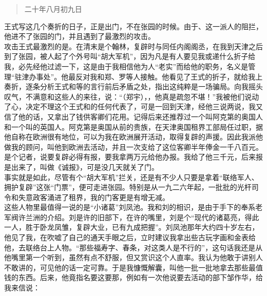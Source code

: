 \begin{quote}
\begin{flushright}
	二十年八月初九日\\
\end{flushright}
\end{quote}

王式写这几个奏折的日子，正是出门，不在张园的时候。由于、这一派人的阻拦，他进不了张园的门，并且遇到了最激烈的攻击。\\

攻击王式最激烈的是。在清末是个翰林，复辟时与同任内阁阁丞，在我到天津之后到了张园，被人起了个外号叫“胡大军机”，因为凡是有人要见我或递什么折子给我，必先经他过滤一下，这是由于我相信他为人“老实”而给他的职务，名义是管理“驻津办事处”。他最反对我和郑、罗等人接触。他看见了王式的折子，就给我上奏折，逐条分析王式和等的言行前后矛盾之处，指出这纯粹是一场骗局。向我摇头叹气，不满意和这些人的来往，说：“（郑宇），，他真是疏忽不堪！”我被他们说动了心，决定不理这个王式和的任何代表了，可是一回到天津，经他三说两说，我又信了他的话，又拿出了钱供客卿们花用。记得后来还推荐过一个叫阿克第的奥国人和一个叫的英国人。阿克第是奥国从前的贵族，在天津奥国租界工部局任过职，据他自称在欧洲很有地位，可以为我在欧洲展开活动，取得复辟的声援。因此我派他做我的顾问，叫他到欧洲去活动，并且一次支给了这位客卿半年俸金一千八百元。是个记者，说要复辟必得有报，要我拿两万元给他办报。我给了他三千元，后来报是出来了，叫做《诚报》，可是没几天就关了门。\\

事实就是如此，尽管有个“胡大军机”拦关，还是有不少人只要是拿着“联络军人、拥护复辟”这张“门票”，便可走进张园。特别是从一九二六年起，一批批的光杆司令和失意政客涌进了租界，我的门客更是有增无减。\\

这些人物里最值得一说的是“小诸葛”刘凤池。我和刘的相识，是由于手下的奉系老军阀许兰洲的介绍。刘是许的旧部下，在许的嘴里，刘是个“现代的诸葛亮，得此一人，胜于卧龙凤雏，复辟大业，已有九成把握”。刘凤池那年大约四十岁左右，他见了我，在吹嘘了自己的通天手眼之后，立时建议我拿出些古玩字画和金表给他，去联络台上人物。“那些福寿字、春条，对这类人是不行的”，这句话我还是从他嘴里第一个听到，虽然有点不舒服，但又赏识这个人直率。我认为他敢于讲别人不敢讲的，可见他的话一定可靠。于是我慷慨解囊，叫他一批一批地拿去那些最值钱的东西。后来，他竟指名要这要那，例如有一次他说要去活动的部下邹作华，给我来信说：\\

